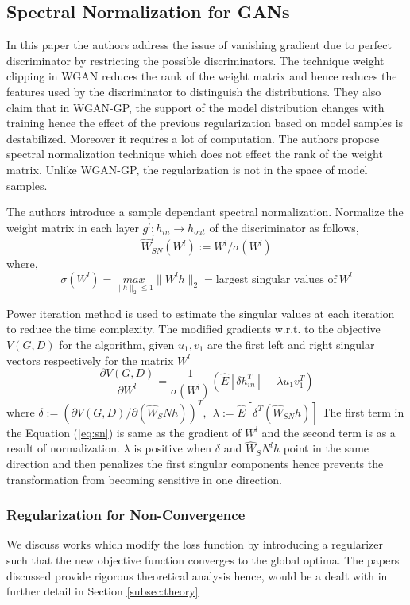 \subsection*{Spectral Normalization for GANs \citep{spectral}}
In this paper the authors address the issue of vanishing gradient due to perfect discriminator by restricting the possible discriminators. The technique weight clipping in WGAN reduces the rank of the weight matrix and hence reduces the features used by the discriminator to distinguish the distributions. They also claim that in WGAN-GP, the support of the model distribution changes with training hence the effect of the previous regularization based on model samples is destabilized. Moreover it requires a lot of computation. The authors propose spectral normalization technique which does not effect the rank of the weight matrix. Unlike WGAN-GP, the regularization is not in the space of model samples. 

The authors introduce a sample dependant spectral normalization. Normalize the weight matrix in each layer $g^l: h_{in} \rightarrow h_{out}$ of the discriminator as follows, 
$$\hat{W}_{SN}^l(W^l) := W^l/\sigma(W^l)$$ where, 
$$\sigma(W^l) = \underset{\parallel h \parallel_2 \leq 1}{max} \parallel W^l h\parallel_2 = \text{largest singular values of} \  W^l $$

Power iteration method is used to estimate the singular values at each iteration to reduce the time complexity. The modified gradients w.r.t. to the objective $V(G, D)$ for the algorithm, given $u_1, v_1$ are the first left and right singular vectors respectively for the matrix $W^l$ 
\begin{equation}
    \label{eq:sn}
    \frac{\partial V(G, D) }{\partial W^l} = \frac{1}{\sigma(W^l)} (\hat{E} [\delta h_{in}^T] - \lambda u_1 v_1^T)
\end{equation}
where $\delta := (\partial V(G,D)/\partial(\hat{W}_SN h))^T, \ \ \lambda := \hat{E} [\delta^T (\hat{W}_{SN} h)]$
The first term in the Equation (\ref{eq:sn}) is same as the gradient of $W^l$ and the second term is as a result of normalization. $\lambda$ is positive when $\delta$ and $\hat{W}_SN^l h$ point in the same direction and then penalizes the first singular components hence prevents the transformation from becoming sensitive in one direction.
\\
\subsubsection{Regularization for Non-Convergence} We discuss works which modify the loss function by introducing a regularizer such that the new objective function converges to the global optima. The papers discussed provide rigorous theoretical analysis hence, would be a dealt with in further detail in Section \ref{subsec:theory}
